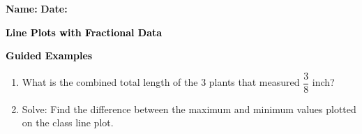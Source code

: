 \documentclass[12pt, letterpaper, fleqn]{article}
\begin{document}
\textbf{Name:} \underline{\hspace{5cm}}
\hfill
\textbf{Date:} \underline{\hspace{3cm}}\\

\begin{tcolorbox}[colback=customteal!20]
    \large\textcolor{black}{\textbf{Line Plots with Fractional Data}}
\end{tcolorbox}
\newpage
\begin{tcolorbox}[colback=customteal!20]
    \large\textcolor{black}{\textbf{Guided Examples}}
\end{tcolorbox}
\begin{enumerate}[itemsep=3.5cm, leftmargin=0.6cm]
\item What is the combined total length of the 3 plants that measured $\dfrac{3}{8}$ inch?
\vspace{3cm}
\item Solve: Find the difference between the maximum and minimum values plotted on the class line plot.
\end{enumerate}
\end{document}
